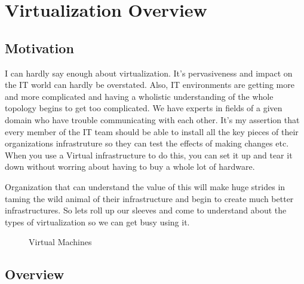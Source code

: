 \section{Virtualization Overview}

\subsection{Motivation}

I can hardly say enough about virtualization.  It's pervasiveness and
impact on the IT world can hardly be overstated.  Also, IT
environments are getting more and more complicated and having a
wholistic understanding of the whole topology begins to get too
complicated.  We have experts in fields of a given domain who have
trouble communicating with each other.  It's my assertion that every
member of the IT team should be able to install all the key pieces of
their organizations infrastruture so they can test the effects of
making changes etc.  When you use a Virtual infrastructure to do this,
you can set it up and tear it down without worring about having to buy
a whole lot of hardware.

Organization that can understand the value of this will make huge
strides in taming the wild animal of their infrastructure and begin to
create much better infrastructures.  So lets roll up our sleeves and
come to understand about the types of virtualization so we can get
busy using it.
	
\begin{figure}[h!]
  \centering
  \caption{Virtual Machines}
\end{figure}

\subsection{Overview}
	
